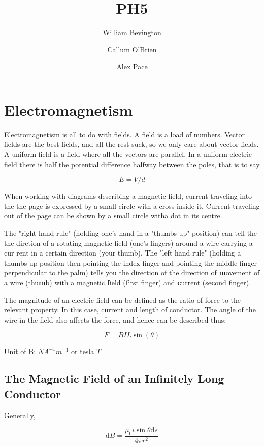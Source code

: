 \documentclass{article}
\title{PH5}
\author{William Bevington \and Callum O'Brien \and Alex Pace}
\begin{document}
\maketitle
\tableofcontents
\newpage

\section{Electromagnetism}

Electromagnetism is all to do with fields. A field is a load of numbers. Vector fields are the best fields, and all the rest suck, so we only care about vector fields. A uniform field is a field where all the vectors are parallel. In a uniform electric field there is half the potential difference halfway between the poles, that is to say

\[E=V/d\]

\noindent When working with diagrams describing a magnetic field, current traveling into the the page is expressed by a small circle with a cross inside it. Current traveling out of the page can be shown by a small circle witha dot in its centre.

The "right hand rule" (holding one's hand in a "thumbs up" position) can tell the the dirction of a rotating magnetic field (one's fingers) around a wire carrying a cur
rent in a certain direction (your thumb). The "left hand rule" (holding a thumbs up position then pointing the index finger and pointing the middle finger perpendicular to the palm) tells you the direction of the direction of \textbf{m}ovement of a wire (thu\textbf{m}b) with a magnetic \textbf{f}ield (\textbf{f}irst finger) and \textbf{c}urrent (se\textbf{c}ond finger).

The magnitude of an electric field can be defined as the ratio of force to the relevant property. In this case, current and length of conductor. The angle of the wire in the field also affects the force, and hence can be described thus:

\[F=BIL\sin\left(\theta\right)\]

\noindent Unit of B: \(NA^{-1}m^{-1}\) or tesla \(T\)

\subsection{The Magnetic Field of an Infinitely Long Conductor}

Generally,

\[\textrm{d}B = \frac{\mu_0 i \sin\theta \textrm{d}s}{4\pi r^2}\]
\end{document}
